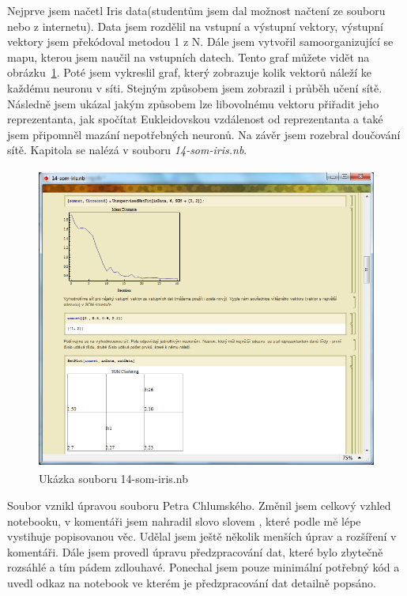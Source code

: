\documentclass[11pt,twoside,a4paper]{book}
\begin{document}
Nejprve jsem načetl Iris data(studentům jsem dal možnost načtení ze souboru nebo z internetu). Data jsem rozdělil na vstupní a výstupní vektory, výstupní vektory jsem překódoval metodou 1 z N. Dále jsem vytvořil samoorganizující se mapu, kterou jsem naučil na vstupních datech. Tento graf můžete vidět na obrázku~\ref{fig:som-iris}. Poté jsem vykreslil graf, který zobrazuje kolik vektorů náleží ke každému neuronu v síti. Stejným způsobem jsem zobrazil i průběh učení sítě. Následně jsem ukázal jakým způsobem lze libovolnému vektoru přiřadit jeho reprezentanta, jak spočítat Eukleidovskou vzdálenost od reprezentanta a také jsem připomněl mazání nepotřebných neuronů. Na závěr jsem rozebral doučování sítě. Kapitola se nalézá v souboru \textit{14-som-iris.nb}.

\begin{figure}[h!]
\begin{center}
\includegraphics[height=10cm]{figures/ukazka14.png}
\caption{Ukázka souboru 14-som-iris.nb}
\label{fig:som-iris}
\end{center}
\end{figure}

Soubor vznikl úpravou souboru Petra Chlumského.\cite{chlumsky} Změnil jsem celkový vzhled notebooku, v komentáři jsem nahradil slovo  slovem , které podle mě lépe vystihuje popisovanou věc. Udělal jsem ještě několik menších úprav a rozšíření v komentáři. Dále jsem provedl úpravu předzpracování dat, které bylo zbytečně rozsáhlé a tím pádem zdlouhavé. Ponechal jsem pouze minimální potřebný kód a uvedl odkaz na notebook ve kterém je předzpracování dat detailně popsáno.
\end{document}
